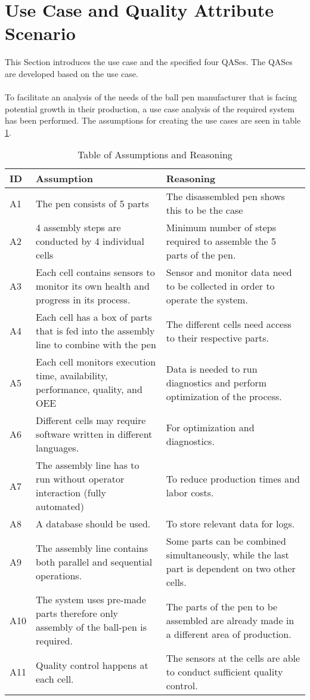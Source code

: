\section{Use Case and Quality Attribute Scenario}
\label{sec:use_case_and_qas}
\noindent
This Section introduces the use case and the specified four QASes.
The QASes are developed based on the use case.
\\ \\
To facilitate an analysis of the needs of the ball pen manufacturer that is facing potential growth in their production, a use case analysis of the required system has been performed. The assumptions for creating the use cases are seen in table \ref{tab:Assumptions Table}.

\begin{table}[ht]
\centering
\begin{tabular}{|l|p{3.5cm}|p{3.5cm}|}
\hline
\textbf{ID} & \textbf{Assumption} & \textbf{Reasoning} \\
\hline
A1 & The pen consists of 5 parts & The disassembled pen shows this to be the case \\
\hline
A2 & 4 assembly steps are conducted by 4 individual cells & Minimum number of steps required to assemble the 5 parts of the pen. \\
\hline
A3 & Each cell contains sensors to monitor its own health and progress in its process. &  Sensor and monitor data need to be collected in order to operate the system. \\
\hline
A4 & Each cell has a box of parts that is fed into the assembly line to combine with the pen & The different cells need access to their respective parts. \\
\hline
A5 & Each cell monitors execution time, availability, performance, quality, and OEE & Data is needed to run diagnostics and perform optimization of the process. \\
\hline
A6 & Different cells may require software written in different languages. & For optimization and diagnostics. \\
\hline
A7 & The assembly line has to run without operator interaction (fully automated) & To reduce production times and labor costs. \\
\hline
A8 & A database should be used. & To store relevant data for logs. \\
\hline
A9 & The assembly line contains both parallel and sequential operations. & Some parts can be combined simultaneously, while the last part is dependent on two other cells. \\
\hline
A10 & The system uses pre-made parts therefore only assembly of the ball-pen is required. & The parts of the pen to be assembled are already made in a different area of production. \\
\hline
A11 & Quality control happens at each cell. & The sensors at the cells are able to conduct sufficient quality control. \\
\hline
\end{tabular}
\caption{Table of Assumptions and Reasoning}
\label{tab:Assumptions Table}
\end{table}

